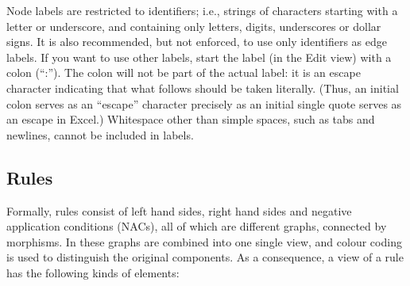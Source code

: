 Node labels are restricted to identifiers; i.e., strings of characters starting
with a letter or underscore, and containing only letters, digits, underscores
or dollar signs. It is also recommended, but not enforced, to use only
identifiers as edge labels. If you want to use other labels, start the label
(in the Edit view) with a colon (``\textsf{:}''). The colon will not be part of
the actual label: it is an escape character indicating that what follows should
be taken literally. (Thus, an initial colon serves as an ``escape'' character
precisely as an initial single quote serves as an escape in Excel.) Whitespace
other than simple spaces, such as tabs and newlines, cannot be included in
labels.

%
%
%

\subsection{Rules}

Formally, rules consist of left hand sides, right hand sides and negative
application conditions (NACs), all of which are different graphs, connected by
morphisms. In \Groove{} these graphs are combined into one single view, and
colour coding is used to distinguish the original components. As a consequence,
a \Groove{} view of a rule has the following kinds of elements:

